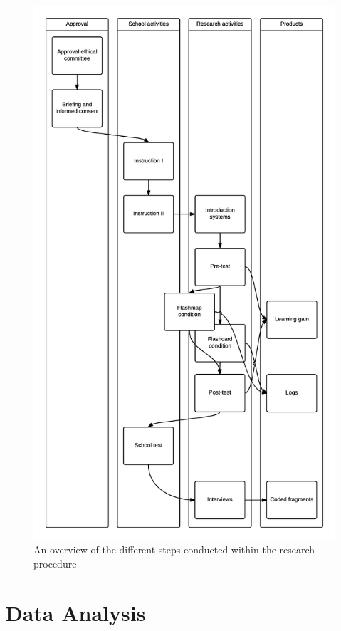 \begin{figure}
    \centering
    \includegraphics[height=.85\textheight]{img/procedure}
    \caption{An overview of the different steps conducted within the research procedure}
    \label{fig:procedure}
\end{figure}

\section{Data Analysis}

